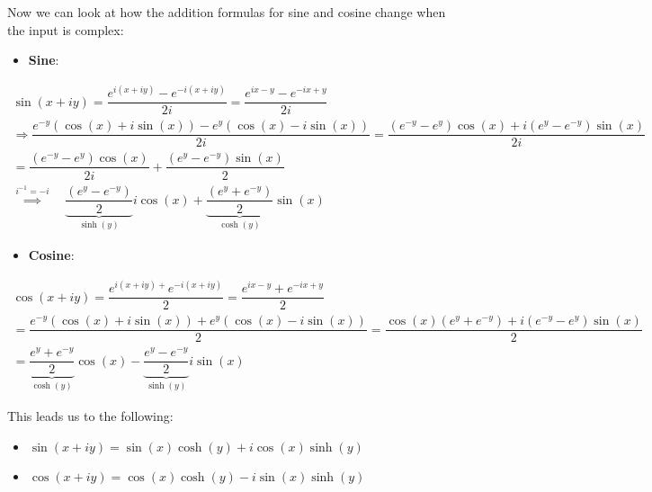 \par\bigskip
\noindent Now we can look at how the addition formulas for sine and cosine change when the input is complex:
\par\bigskip
\begin{itemize}
  \item\textbf{Sine}:
\end{itemize}
\begin{equation*}
  \begin{gathered}
    \sin(x+iy) = \dfrac{e^{i(x+iy)}-e^{-i(x+iy)}}{2i} = \dfrac{e^{ix-y}-e^{-ix+y}}{2i}\\
    \Rightarrow \dfrac{e^{-y}(\cos(x)+i\sin(x))-e^y(\cos(x)-i\sin(x))}{2i} = \dfrac{(e^{-y}-e^y)\cos(x)+i(e^y-e^{-y})\sin(x)}{2i}\\
    = \dfrac{(e^{-y}-e^y)\cos(x)}{2i}+\dfrac{(e^y-e^{-y})\sin(x)}{2}\\
    \stackrel{i^{-1}=-i}{\implies}\quad\underbrace{\dfrac{(e^y-e^{-y})}{2}}_{\text{$\sinh(y)$}}i\cos(x)+\underbrace{\dfrac{(e^y+e^{-y})}{2}}_{\text{$\cosh(y)$}}\sin(x)
  \end{gathered}
\end{equation*}
\par\bigskip
\begin{itemize}
  \item\textbf{Cosine}:
\end{itemize}
\begin{equation*}
  \begin{gathered}
    \cos(x+iy) = \dfrac{e^{i(x+iy)+}e^{-i(x+iy)}}{2} = \dfrac{e^{ix-y}+e^{-ix+y}}{2}\\
    = \dfrac{e^{-y}(\cos(x)+i\sin(x))+e^y(\cos(x)-i\sin(x))}{2} = \dfrac{\cos(x)(e^y+e^{-y})+i(e^{-y}-e^y)\sin(x)}{2}\\
    = \underbrace{\dfrac{e^y+e^{-y}}{2}}_{\text{$\cosh(y)$}}\cos(x)-\underbrace{\dfrac{e^y-e^{-y}}{2}}_{\text{$\sinh(y)$}}i\sin(x)
  \end{gathered}
\end{equation*}
\par\bigskip
\noindent This leads us to the following:
\par\bigskip
\begin{theo}{}
  \begin{itemize}
    \item $\sin(x+iy) = \sin(x)\cosh(y)+i\cos(x)\sinh(y)$
    \item $\cos(x+iy) = \cos(x)\cosh(y)-i\sin(x)\sinh(y)$
  \end{itemize}
\end{theo}
\par\bigskip
